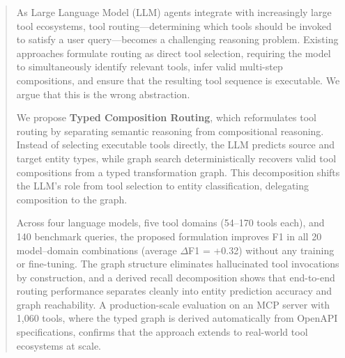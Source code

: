 
\begin{abstract}

As Large Language Model (LLM) agents integrate with increasingly large tool ecosystems, tool routing---determining which tools should be invoked to satisfy a user query---becomes a challenging reasoning problem. Existing approaches formulate routing as direct tool selection, requiring the model to simultaneously identify relevant tools, infer valid multi-step compositions, and ensure that the resulting tool sequence is executable. We argue that this is the wrong abstraction.

We propose \textbf{Typed Composition Routing}, which reformulates tool routing by separating semantic reasoning from compositional reasoning. Instead of selecting executable tools directly, the LLM predicts source and target entity types, while graph search deterministically recovers valid tool compositions from a typed transformation graph. This decomposition shifts the LLM's role from tool selection to entity classification, delegating composition to the graph.

Across four language models, five tool domains (54--170 tools each), and 140 benchmark queries, the proposed formulation improves F1 in all 20 model--domain combinations (average $\Delta$F1 = +0.32) without any training or fine-tuning. The graph structure eliminates hallucinated tool invocations by construction, and a derived recall decomposition shows that end-to-end routing performance separates cleanly into entity prediction accuracy and graph reachability.
A production-scale evaluation on an MCP server with 1,060 tools, where the typed graph is derived automatically from OpenAPI specifications, confirms that the approach extends to real-world tool ecosystems at scale.

\end{abstract}
